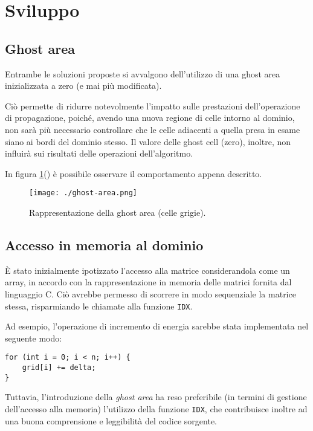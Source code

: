 \section{Sviluppo}

\subsection{Ghost area}

Entrambe le soluzioni proposte si avvalgono dell'utilizzo di una ghost area
inizializzata a zero (e mai più modificata).

Ciò permette di ridurre notevolmente l'impatto sulle prestazioni
dell'operazione di propagazione, poiché, avendo una nuova regione di celle
intorno al dominio, non sarà più necessario controllare che le celle adiacenti a
quella presa in esame siano ai bordi del dominio stesso.
Il valore delle ghost cell (zero), inoltre, non influirà sui risultati delle
operazioni dell'algoritmo.

In figura \ref{fig:ghostarea}(\cite{marzollaghost}) è possibile osservare il comportamento appena
descritto.

\begin{figure}[h!]
  \centering
  \texttt{[image: ./ghost-area.png]}
  \caption{Rappresentazione della ghost area (celle
  grigie).}\label{fig:ghostarea}
\end{figure}

\subsection{Accesso in memoria al dominio}

È stato inizialmente ipotizzato l'accesso alla matrice considerandola come un
array, in accordo con la rappresentazione in memoria delle matrici fornita dal
linguaggio C.
Ciò avrebbe permesso di scorrere in modo sequenziale la matrice stessa,
risparmiando le chiamate alla funzione \texttt{IDX}.

Ad esempio, l'operazione di incremento di energia sarebbe stata implementata nel
seguente modo:
\begin{verbatim}
for (int i = 0; i < n; i++) {
    grid[i] += delta;
}
\end{verbatim}

Tuttavia, l'introduzione della \textit{ghost area} ha reso preferibile (in
termini di gestione dell'accesso alla memoria) l'utilizzo della funzione
\texttt{IDX}, che contribuisce inoltre ad una buona comprensione e leggibilità
del codice sorgente.

